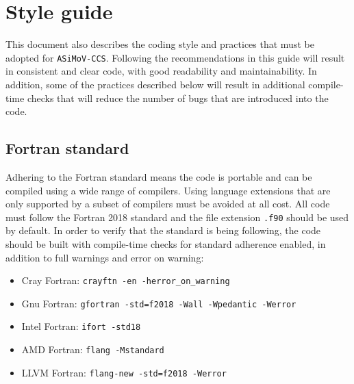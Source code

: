 \documentclass[11pt]{report}
\newcommand{\accs}{\texttt{ASiMoV-CCS}}
\begin{document}
\chapter{Style guide}
This document also describes the coding style and practices that must be adopted for \accs . Following the recommendations in this guide will result in consistent and clear code, with good readability and maintainability. In addition,  some of the practices described below will result in additional compile-time checks that will reduce the number of bugs that are introduced into the code.

\section{Fortran standard}
Adhering to the Fortran standard means the code is portable and can be compiled using a wide range of compilers. 
Using language extensions that are only supported by a subset of compilers must be avoided at all cost. All code 
must follow the Fortran 2018 standard and the file extension \texttt{.f90} should be used by default. In order to 
verify that the standard is being following, the code should be built with compile-time checks for standard 
adherence enabled, in addition to full warnings and error on warning:
\begin{itemize}
\item Cray Fortran: \texttt{crayftn -en -herror\_on\_warning}
\item Gnu Fortran: \texttt{gfortran -std=f2018 -Wall -Wpedantic -Werror}
\item Intel Fortran: \texttt{ifort -std18}
\item AMD Fortran: \texttt{flang -Mstandard}
\item LLVM Fortran: \texttt{flang-new -std=f2018 -Werror}
\end{itemize}
\end{document}
